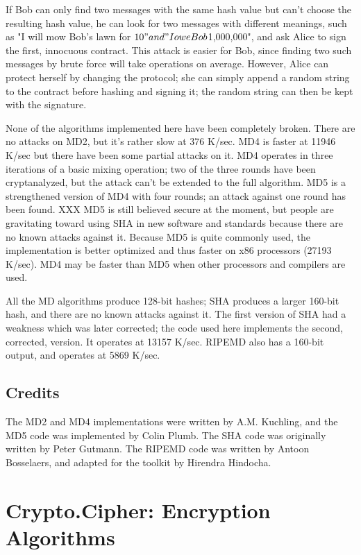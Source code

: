 \documentclass{howto}
\begin{document}
If Bob can only find two messages with the same hash value but can't
choose the resulting hash value, he can look for two messages with
different meanings, such as "I will mow Bob's lawn for $10" and "I owe
Bob $1,000,000", and ask Alice to sign the first, innocuous contract.
This attack is easier for Bob, since finding two such messages by brute
force will take  operations on average.  However,
Alice can protect herself by changing the protocol; she can simply
append a random string to the contract before hashing and signing it;
the random string can then be kept with the signature.

None of the algorithms implemented here have been completely broken.
There are no attacks on MD2, but it's rather slow at 376 K/sec.  MD4
is faster at 11946 K/sec but there have been some partial attacks on
it.  MD4 operates in three iterations of a basic mixing operation; two
of the three rounds have been cryptanalyzed, but the attack can't be
extended to the full algorithm.  MD5 is a strengthened version of MD4
with four rounds; an attack against one round has been found.  XXX MD5
is still believed secure at the moment, but people are gravitating
toward using SHA in new software and standards because there are no
known attacks against it.  Because MD5 is quite commonly used, the
implementation is better optimized and thus faster on x86 processors
(27193 K/sec).  MD4 may be faster than MD5 when other processors and
compilers are used.

All the MD algorithms produce 128-bit hashes; SHA produces a larger 160-bit
hash, and there are no known attacks against it.  The first version of
SHA had a weakness which was later corrected; the code used here
implements the second, corrected, version.  It operates at 13157 K/sec.
RIPEMD also has a 160-bit output, and operates at 5869 K/sec.

\subsection{Credits}
The MD2 and  MD4 implementations were written by A.M. Kuchling,
and the MD5 code was implemented by Colin Plumb.  The SHA code was
originally written by Peter Gutmann.  The RIPEMD code was written by
Antoon Bosselaers, and adapted for the toolkit by Hirendra Hindocha.

\section{Crypto.Cipher: Encryption Algorithms}
\end{document}
